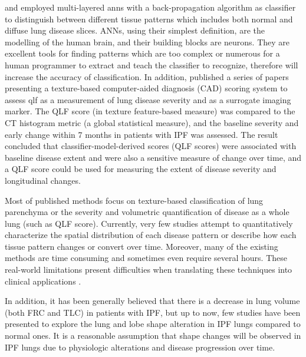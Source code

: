 \cite{uchiyama2003quantitative} and \cite{kim2005computer} employed multi-layered \gls{anns} with a back-propagation algorithm as classifier to distinguish between different tissue patterns which includes both normal and diffuse lung disease slices. ANNs, using their simplest definition, are the modelling of the human brain, and their building blocks are neurons. They are excellent tools for finding patterns which are too complex or numerous for a human programmer to extract and teach the classifier to recognize, therefore will increase the accuracy of classification. In addition, \cite{kim2010computer,kim2011quantitative,kim2015comparison} published a series of papers presenting a texture-based computer-aided diagnosis (CAD) scoring system to assess \gls{qlf} as a measurement of lung disease severity and as a surrogate imaging marker. The QLF score (in texture feature-based measure) was compared to the CT histogram metric (a global statistical measure), and the baseline severity and early change within 7 months in patients with IPF was assessed. The result concluded that classifier-model-derived scores (QLF scores) were associated with baseline disease extent and were also a sensitive measure of change over time, and a QLF score could be used for measuring the extent of disease severity and longitudinal changes.

Most of published methods focus on texture-based classification of lung parenchyma or the severity and volumetric quantification of disease as a whole lung (such as QLF score). Currently, very few studies attempt to quantitatively characterize the spatial distribution of each disease pattern or describe how each tissue pattern changes or convert over time. Moreover, many of the existing methods are time consuming and sometimes even require several hours. These real-world limitations present difficulties when translating these techniques into clinical applications \citep{bartholmai2013quantitative}.

In addition, it has been generally believed that there is a decrease in lung volume (both FRC and TLC) in patients with IPF, but up to now, few studies have been presented to explore the lung and lobe shape alteration in IPF lungs compared to normal ones. It is a reasonable assumption that shape changes will be observed in IPF lungs due to physiologic alterations and disease progression over time. 

